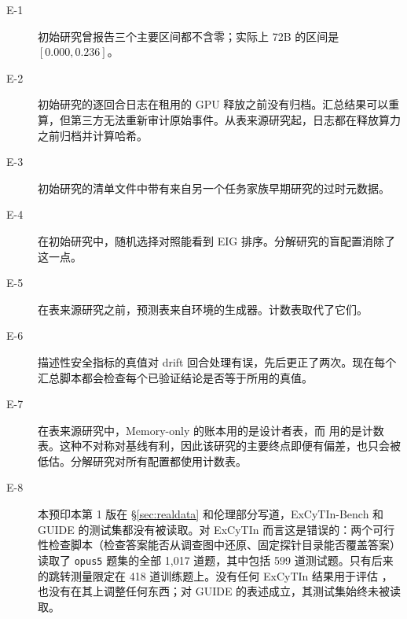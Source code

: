 \begin{description}
  \item[E-1] 初始研究曾报告三个主要区间都不含零；实际上 72B 的区间是 $[0.000, 0.236]$。
  \item[E-2] 初始研究的逐回合日志在租用的 GPU 释放之前没有归档。汇总结果可以重算，但第三方无法重新审计原始事件。从表来源研究起，日志都在释放算力之前归档并计算哈希。
  \item[E-3] 初始研究的清单文件中带有来自另一个任务家族早期研究的过时元数据。
  \item[E-4] 在初始研究中，随机选择对照能看到 EIG 排序。分解研究的盲配置消除了这一点。
  \item[E-5] 在表来源研究之前，预测表来自环境的生成器。计数表取代了它们。
  \item[E-6] 描述性安全指标的真值对 drift 回合处理有误，先后更正了两次。现在每个汇总脚本都会检查每个已验证结论是否等于所用的真值。
  \item[E-7] 在表来源研究中，Memory-only 的账本用的是设计者表，而 \hesp{} 用的是计数表。这种不对称对基线有利，因此该研究的主要终点即便有偏差，也只会被低估。分解研究对所有配置都使用计数表。
  \item[E-8] 本预印本第 1 版在 \S\ref{sec:realdata} 和伦理部分写道，ExCyTIn-Bench 和 GUIDE 的测试集都没有被读取。对 ExCyTIn 而言这是错误的：两个可行性检查脚本（检查答案能否从调查图中还原、固定探针目录能否覆盖答案）读取了 \texttt{opus5} 题集的全部 1{,}017 道题，其中包括 599 道测试题。只有后来的跳转测量限定在 418 道训练题上。没有任何 ExCyTIn 结果用于评估 \hesp{}，也没有在其上调整任何东西；对 GUIDE 的表述成立，其测试集始终未被读取。
\end{description}
